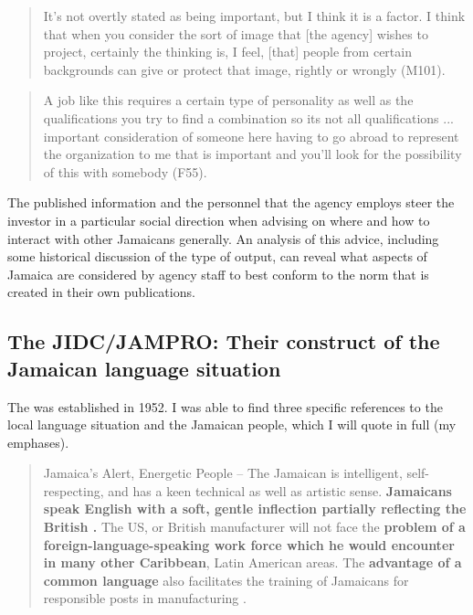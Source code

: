 \begin{quote}
	It's not overtly stated as being important, but I think it is a factor.  I think that when you consider the sort of image that [the agency] wishes to project, certainly the thinking is, I feel, [that] people from certain backgrounds can give or protect that image, rightly or wrongly (M101).   
\end{quote}

\begin{quote}
	A job like this requires a certain type of personality as well as the qualifications you try to find a combination so its not all qualifications ... important consideration of someone here having to go abroad to represent the organization to me that is important and you’ll look for the possibility of this with somebody (F55).
\end{quote}

The published  information and the personnel that the agency employs steer the investor in a particular social direction when advising on where and how to interact with other Jamaicans generally.  An analysis of this advice, including some historical discussion of the type of output, can reveal what aspects of Jamaica are considered by agency staff to best conform to the norm that is created in their own publications.  

\subsection{{The JIDC\slash JAMPRO: Their construct of the Jamaican language situation}}%
The  was established in 1952.  I was able to find three specific references to the local language situation and the Jamaican people, which I will quote in full (my emphases).

\begin{quote}
	Jamaica’s Alert, Energetic People – The Jamaican is intelligent, self-re\-spect\-ing, and has a keen technical as well as artistic sense.  \textbf{Jamaicans speak English with a soft, gentle inflection partially reflecting the British .}  The US,  or British manufacturer will not face the \textbf{problem of a foreign-language-speaking work force which he would encounter in many other Caribbean}, Latin American areas.  The \textbf{advantage of a common language} also facilitates the training of Jamaicans for responsible posts in manufacturing \citep[11--12]{JIDC1957}.  
\end{quote}


